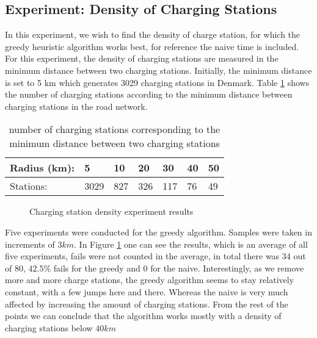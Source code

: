 \subsection{Experiment: Density of Charging Stations}
In this experiment, we wish to find the density of charge station, for which the greedy heuristic algorithm works best, for reference the naive time is included. For this experiment, the density of charging stations are measured in the minimum distance between two charging stations. Initially, the minimum distance is set to 5 km which generates 3029 charging stations in Denmark. Table \ref{table:chargedensity} shows the number of charging stations according to the minimum distance between charging stations in the road network.

\begin{table}[!htb]
\centering
		\begin{tabular}{ p{1.85cm} p{0.67cm} p{0.63cm} p{0.63cm} p{0.63cm} p{0.63cm} p{0.63cm} } \hline
		Radius (km): & 5 & 10 & 20 & 30 & 40 & 50 \\ \hline
		Stations: & 3029 & 827 & 326 & 117 & 76 & 49 \\ \hline 
		\end{tabular}
		\caption{number of charging stations corresponding to the minimum distance between two charging stations}
	\label{table:chargedensity}
	\end{table}


\begin{figure}[!htb]
\centering
{}
\caption{Charging station density experiment results} 
\label{fig:cs_density}
\end{figure}


Five experiments were conducted for the greedy algorithm. Samples were taken in increments of $3\si{km}$. In Figure \ref{fig:cs_density} one can see the results, which is an average of all five experiments, fails were not counted in the average, in total there was $34$ out of $80$, $42.5\%$ fails for the greedy and $0$ for the naive. Interestingly, as we remove more and more charge stations, the greedy algorithm seems to stay relatively constant, with a few jumps here and there. Whereas the naive is very much affected by increasing the amount of charging stations. From the rest of the points we can conclude that the algorithm works mostly with a density of charging stations below $40\si{km}$

